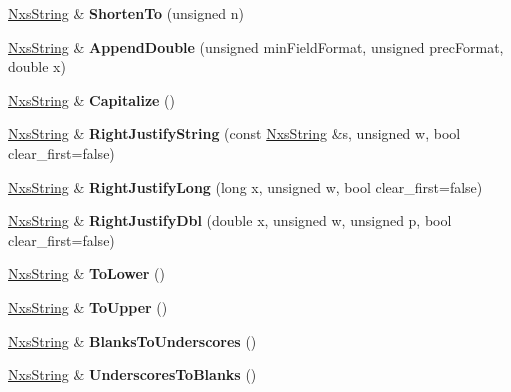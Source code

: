 \begin{DoxyCompactItemize}
\item 
\hypertarget{classNxsString_acd7d1c1d359c1b7ef1e4c8bd8622b802}{
\hyperlink{classNxsString}{NxsString} \& {\bfseries ShortenTo} (unsigned n)}
\label{classNxsString_acd7d1c1d359c1b7ef1e4c8bd8622b802}

\item 
\hypertarget{classNxsString_a7c7a84d57ced24640a02fdbc7be0bbc6}{
\hyperlink{classNxsString}{NxsString} \& {\bfseries AppendDouble} (unsigned minFieldFormat, unsigned precFormat, double x)}
\label{classNxsString_a7c7a84d57ced24640a02fdbc7be0bbc6}

\item 
\hypertarget{classNxsString_a6c8fffe2a4a5f4223671fb5327581e38}{
\hyperlink{classNxsString}{NxsString} \& {\bfseries Capitalize} ()}
\label{classNxsString_a6c8fffe2a4a5f4223671fb5327581e38}

\item 
\hypertarget{classNxsString_a4d0871e7dde794face7cb0f68e8d36ca}{
\hyperlink{classNxsString}{NxsString} \& {\bfseries RightJustifyString} (const \hyperlink{classNxsString}{NxsString} \&s, unsigned w, bool clear\_\-first=false)}
\label{classNxsString_a4d0871e7dde794face7cb0f68e8d36ca}

\item 
\hypertarget{classNxsString_ae7e8aef09b2ec6e928bd881726954bd3}{
\hyperlink{classNxsString}{NxsString} \& {\bfseries RightJustifyLong} (long x, unsigned w, bool clear\_\-first=false)}
\label{classNxsString_ae7e8aef09b2ec6e928bd881726954bd3}

\item 
\hypertarget{classNxsString_a273973a9da80ae8d41d913a2ba9e1def}{
\hyperlink{classNxsString}{NxsString} \& {\bfseries RightJustifyDbl} (double x, unsigned w, unsigned p, bool clear\_\-first=false)}
\label{classNxsString_a273973a9da80ae8d41d913a2ba9e1def}

\item 
\hypertarget{classNxsString_ac32218d5a09d7698a6d1e96a739766e5}{
\hyperlink{classNxsString}{NxsString} \& {\bfseries ToLower} ()}
\label{classNxsString_ac32218d5a09d7698a6d1e96a739766e5}

\item 
\hypertarget{classNxsString_a510af5287bee6eee8227d08715cd0ef4}{
\hyperlink{classNxsString}{NxsString} \& {\bfseries ToUpper} ()}
\label{classNxsString_a510af5287bee6eee8227d08715cd0ef4}

\item 
\hypertarget{classNxsString_a3ff89d00ced11f031db05153b1bbb095}{
\hyperlink{classNxsString}{NxsString} \& {\bfseries BlanksToUnderscores} ()}
\label{classNxsString_a3ff89d00ced11f031db05153b1bbb095}

\item 
\hypertarget{classNxsString_a523fb661c23791d3e0d0d022b62c835c}{
\hyperlink{classNxsString}{NxsString} \& {\bfseries UnderscoresToBlanks} ()}
\label{classNxsString_a523fb661c23791d3e0d0d022b62c835c}

\end{DoxyCompactItemize}
